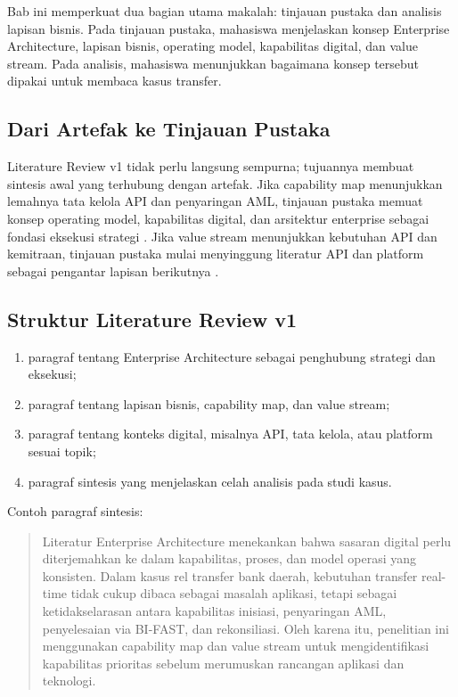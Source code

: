 Bab ini memperkuat dua bagian utama makalah: tinjauan pustaka dan analisis
lapisan bisnis. Pada tinjauan pustaka, mahasiswa menjelaskan konsep Enterprise
Architecture, lapisan bisnis, operating model, kapabilitas digital, dan value
stream. Pada analisis, mahasiswa menunjukkan bagaimana konsep tersebut dipakai
untuk membaca kasus transfer.

\subsection{Dari Artefak ke Tinjauan Pustaka}

Literature Review v1 tidak perlu langsung sempurna; tujuannya membuat sintesis
awal yang terhubung dengan artefak. Jika capability map menunjukkan lemahnya
tata kelola API dan penyaringan AML, tinjauan pustaka memuat konsep operating
model, kapabilitas digital, dan arsitektur enterprise sebagai fondasi eksekusi
strategi \cite{ross2006enterprise,ross2019designed}. Jika value stream
menunjukkan kebutuhan API dan kemitraan, tinjauan pustaka mulai menyinggung
literatur API dan platform sebagai pengantar lapisan berikutnya
\cite{jacobson2011apis,parker2016platform}.

\subsection{Struktur Literature Review v1}

\begin{enumerate}
  \item paragraf tentang Enterprise Architecture sebagai penghubung strategi dan
        eksekusi;
  \item paragraf tentang lapisan bisnis, capability map, dan value stream;
  \item paragraf tentang konteks digital, misalnya API, tata kelola, atau
        platform sesuai topik;
  \item paragraf sintesis yang menjelaskan celah analisis pada studi kasus.
\end{enumerate}

Contoh paragraf sintesis:

\begin{quote}
Literatur Enterprise Architecture menekankan bahwa sasaran digital perlu
diterjemahkan ke dalam kapabilitas, proses, dan model operasi yang konsisten.
Dalam kasus rel transfer bank daerah, kebutuhan transfer real-time tidak cukup
dibaca sebagai masalah aplikasi, tetapi sebagai ketidakselarasan antara
kapabilitas inisiasi, penyaringan AML, penyelesaian via BI-FAST, dan
rekonsiliasi. Oleh karena itu, penelitian ini menggunakan capability map dan
value stream untuk mengidentifikasi kapabilitas prioritas sebelum merumuskan
rancangan aplikasi dan teknologi.
\end{quote}

